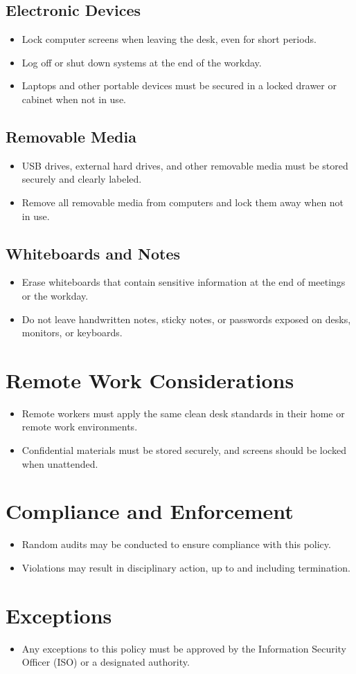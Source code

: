 \subsection{Electronic Devices}
\begin{itemize}
    \item Lock computer screens when leaving the desk, even for short periods.
    \item Log off or shut down systems at the end of the workday.
    \item Laptops and other portable devices must be secured in a locked drawer or cabinet when not in use.
\end{itemize}
\subsection{Removable Media}
\begin{itemize}
    \item USB drives, external hard drives, and other removable media must be stored securely and clearly labeled.
    \item Remove all removable media from computers and lock them away when not in use.
\end{itemize}
\subsection{Whiteboards and Notes}
\begin{itemize}
    \item Erase whiteboards that contain sensitive information at the end of meetings or the workday.
    \item Do not leave handwritten notes, sticky notes, or passwords exposed on desks, monitors, or keyboards.
\end{itemize}
\section{Remote Work Considerations}
\begin{itemize}
    \item Remote workers must apply the same clean desk standards in their home or remote work environments.
    \item Confidential materials must be stored securely, and screens should be locked when unattended.
\end{itemize}
\section{Compliance and Enforcement}
\begin{itemize}
    \item Random audits may be conducted to ensure compliance with this policy.
    \item Violations may result in disciplinary action, up to and including termination.
\end{itemize}
\section{Exceptions}
\begin{itemize}
    \item Any exceptions to this policy must be approved by the Information Security Officer (ISO) or a designated authority.
\end{itemize}

